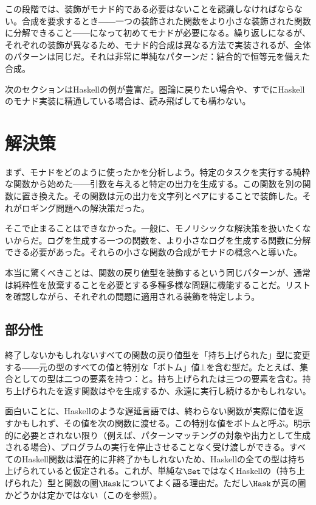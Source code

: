 この段階では、装飾がモナド的である必要はないことを認識しなければならない。合成を要求するとき――一つの装飾された関数をより小さな装飾された関数に分解できること――になって初めてモナドが必要になる。繰り返しになるが、それぞれの装飾が異なるため、モナド的合成は異なる方法で実装されるが、全体のパターンは同じだ。それは非常に単純なパターンだ：結合的で恒等元を備えた合成。

次のセクションはHaskellの例が豊富だ。圏論に戻りたい場合や、すでにHaskellのモナド実装に精通している場合は、読み飛ばしても構わない。

\section{解決策}

まず、モナドをどのように使ったかを分析しよう。特定のタスクを実行する純粋な関数から始めた――引数を与えると特定の出力を生成する。この関数を別の関数に置き換えた。その関数は元の出力を文字列とペアにすることで装飾した。それがロギング問題への解決策だった。

そこで止まることはできなかった。一般に、モノリシックな解決策を扱いたくないからだ。ログを生成する一つの関数を、より小さなログを生成する関数に分解できる必要があった。それらの小さな関数の合成がモナドの概念へと導いた。

本当に驚くべきことは、関数の戻り値型を装飾するという同じパターンが、通常は純粋性を放棄することを必要とする多種多様な問題に機能することだ。リストを確認しながら、それぞれの問題に適用される装飾を特定しよう。

\subsection{部分性}

終了しないかもしれないすべての関数の戻り値型を「持ち上げられた」型に変更する――元の型のすべての値と特別な「ボトム」値$\bot$を含む型だ。たとえば、集合としての型は二つの要素を持つ：と。持ち上げられたは三つの要素を含む。持ち上げられたを返す関数はやを生成するか、永遠に実行し続けるかもしれない。

面白いことに、Haskellのような遅延言語では、終わらない関数が実際に値を返すかもしれず、その値を次の関数に渡せる。この特別な値をボトムと呼ぶ。明示的に必要とされない限り（例えば、パターンマッチングの対象や出力として生成される場合）、プログラムの実行を停止させることなく受け渡しができる。すべてのHaskell関数は潜在的に非終了かもしれないため、Haskellの全ての型は持ち上げられていると仮定される。これが、単純な$\Set$ではなくHaskellの（持ち上げられた）型と関数の圏$\Hask$についてよく語る理由だ。ただし$\Hask$が真の圏かどうかは定かではない（このを参照）。

